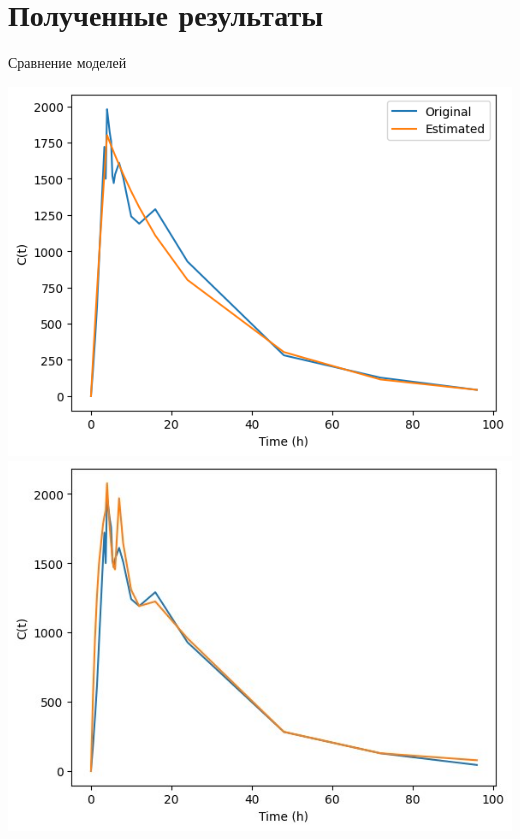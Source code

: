 \documentclass[12pt]{beamer}
\begin{document}
\section{Полученные результаты}
\begin{frame}{Сравнение моделей}
	\begin{minipage}{0.45\linewidth}
		\centering
		\includegraphics[width=\linewidth]{results/basic_1.png}
		\includegraphics[width=\linewidth]{results/1.jpg}
	\end{minipage}
	\begin{minipage}{0.45\linewidth}
		\centering

\end{minipage}
\end{frame}
\end{document}
